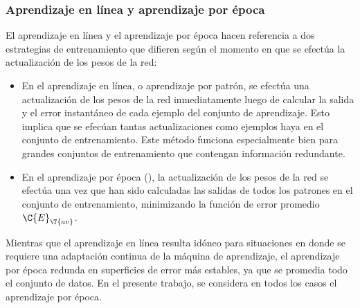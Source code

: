 %
\subsubsection{Aprendizaje en línea y aprendizaje por época}
%
El aprendizaje en línea y el aprendizaje por época hacen referencia
a dos estrategias de entrenamiento que difieren según
el momento en que se efectúa la actualización de los pesos de la
red:
%
\begin{itemize}
\item En el aprendizaje en línea, o aprendizaje por patrón, se efectúa una
  actualización de los pesos de la red inmediatamente
  luego de calcular la salida y el
  error instantáneo de cada ejemplo del conjunto de aprendizaje.
  Esto implica que se efecúan tantas actualizaciones como ejemplos haya
  en el conjunto de entrenamiento.
  Este método funciona especialmente bien
  para grandes conjuntos de entrenamiento que contengan información
  redundante.
\item En el aprendizaje por época (),
  la actualización de los pesos de la red
  se efectúa una vez que han sido calculadas las salidas de todos los
  patrones en el conjunto de entrenamiento, minimizando la función de
  error promedio $\C{E}_{\T{av}}$.
\end{itemize}
%
Mientras que el aprendizaje en línea resulta idóneo para situaciones en donde
se requiere una adaptación continua de la máquina de aprendizaje, el
aprendizaje por época redunda en superficies de error más estables, ya que
se promedia todo el conjunto de datos.
En el presente trabajo, se considera en todos los casos el aprendizaje
por época.




